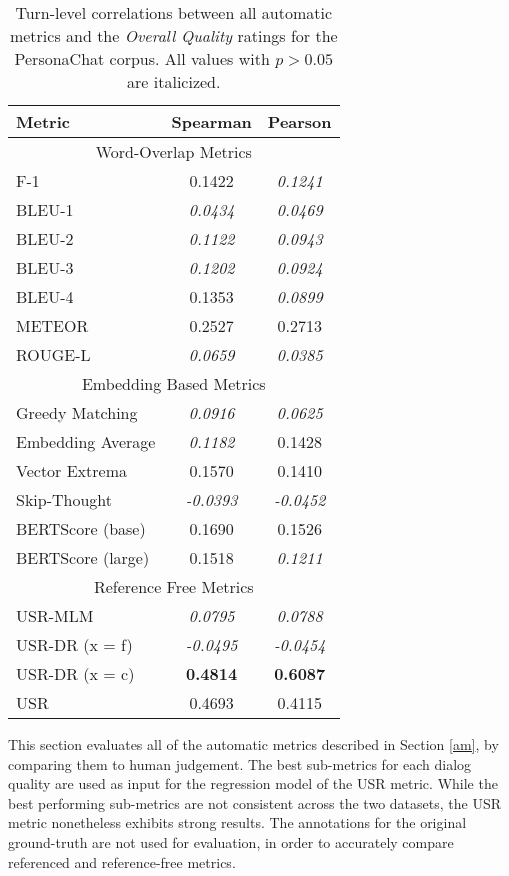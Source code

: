 \documentclass[11pt,a4paper]{article}
\begin{document}
\begin{table}
\centering
\begin{tabular}{|l|c|c|}
\hline
Metric                    & Spearman & Pearson  \\\hline
\multicolumn{3}{|c|}{Word-Overlap Metrics} \\ \hline
F-1 & 0.1422 & \textit{0.1241} \\
BLEU-1 & \textit{0.0434} & \textit{0.0469} \\
BLEU-2 & \textit{0.1122} & \textit{0.0943} \\
BLEU-3 & \textit{0.1202} & \textit{0.0924} \\
BLEU-4 & 0.1353 & \textit{0.0899} \\
METEOR & 0.2527 & 0.2713 \\
ROUGE-L & \textit{0.0659} & \textit{0.0385} \\ \hline
\multicolumn{3}{|c|}{Embedding Based Metrics} \\ \hline
Greedy Matching & \textit{0.0916} & \textit{0.0625} \\
Embedding Average & \textit{0.1182} & 0.1428 \\
Vector Extrema & 0.1570 & 0.1410 \\
Skip-Thought & \textit{-0.0393} & \textit{-0.0452} \\
BERTScore (base) & 0.1690 & 0.1526 \\
BERTScore (large) & 0.1518 & \textit{0.1211} \\ \hline
\multicolumn{3}{|c|}{Reference Free Metrics} \\ \hline
USR-MLM & \textit{0.0795} & \textit{0.0788} \\
USR-DR (x = f) & \textit{-0.0495} & \textit{-0.0454} \\
USR-DR (x = c) & \textbf{0.4814} & \textbf{0.6087} \\
USR & 0.4693 & 0.4115 \\ \hline
\end{tabular}
\caption{Turn-level correlations between all automatic metrics and the \textit{Overall Quality} ratings for the PersonaChat corpus. All values with $p > 0.05$ are italicized.}
\label{tab:turn_overall_pc}
\end{table}

This section evaluates all of the automatic metrics described in Section \ref{am}, by comparing them to human judgement. The best sub-metrics for each dialog quality are used as input for the regression model of the USR metric. While the best performing sub-metrics are not consistent across the two datasets, the USR metric nonetheless exhibits strong results. The annotations for the original ground-truth are not used for evaluation, in order to accurately compare referenced and reference-free metrics.
\end{document}
